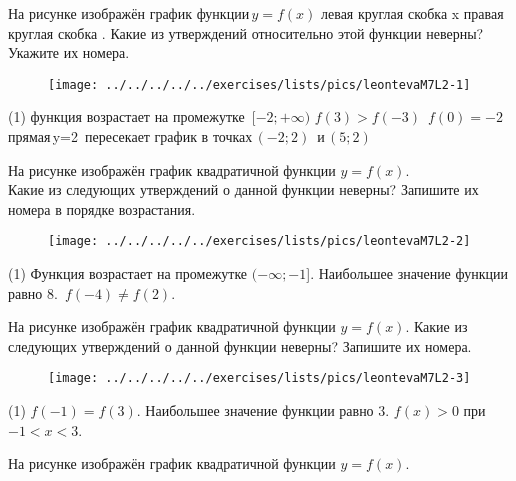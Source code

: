 %
%

\begin{class}[number=1]
	\begin{listofex}
		\item На рисунке изображён график функции \( y=f(x) \) левая круглая скобка x правая круглая скобка . Какие из утверждений относительно этой функции неверны? Укажите их номера.
		\begin{figure}[h!]
			\centering
			\texttt{[image: ../../../../../exercises/lists/pics/leontevaM7L2-1]}
		\end{figure}
		\begin{tasks}(1)
			\task функция возрастает на промежутке  \( [-2; +\infty) \)
			\task \( f(3)> f(-3)  \)
			\task \( f(0) = -2 \)
			\task прямая y=2  пересекает график в точках \(  (-2; 2) \)  и \( (5; 2) \) 
		\end{tasks}
	\newpage
		\item На рисунке изображён график квадратичной функции \( y  =  f(x) \).
		\\
		Какие из следующих утверждений о данной функции неверны? Запишите их номера в порядке возрастания.
		\begin{figure}[h!]
			\centering
			\texttt{[image: ../../../../../exercises/lists/pics/leontevaM7L2-2]}
		\end{figure}
		\begin{tasks}(1)
			\task Функция возрастает на промежутке \( (-\infty;  -1 \)].
			\task Наибольшее значение функции равно \( 8 \).
			\task \( f(-4) \neq f(2) \).
		\end{tasks}
	\newpage
	\item На рисунке изображён график квадратичной функции \( y =  f(x) \).
	Какие из следующих утверждений о данной функции неверны? Запишите их номера.
	\begin{figure}[h!]
		\centering
		\texttt{[image: ../../../../../exercises/lists/pics/leontevaM7L2-3]}
	\end{figure}
	\begin{tasks}(1)
		\task \( f(-1)=f(3) \).
		\task Наибольшее значение функции равно \( 3 \).
		\task \( f(x)>0  \) при  \( -1<x<3 \).
	\end{tasks}
	\newpage
	\item На рисунке изображён график квадратичной функции \( y = f(x) \).
	

\end{listofex}
\end{class}
